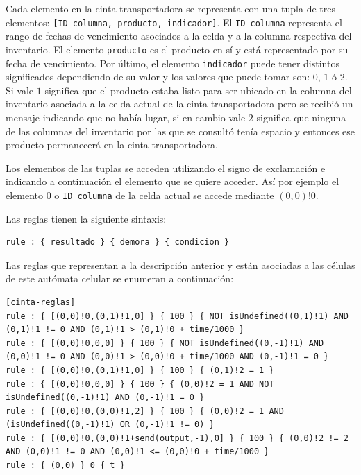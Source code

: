 \documentclass[10pt]{article}
\begin{document}
Cada elemento en la cinta transportadora se representa con una tupla de tres elementos: \texttt{[ID columna, producto, indicador]}. El \texttt{ID columna} representa el rango de fechas de vencimiento asociados a la celda y a la columna respectiva del inventario. El elemento \texttt{producto} es el producto en sí y está representado por su fecha de vencimiento. Por último, el elemento \texttt{indicador} puede tener distintos significados dependiendo de su valor y los valores que puede tomar son: $0$, $1$ ó $2$. Si vale $1$ significa que el producto estaba listo para ser ubicado en la columna del inventario asociada a la celda actual de la cinta transportadora pero se recibió un mensaje indicando que no había lugar, si en cambio vale $2$ significa que ninguna de las columnas del inventario por las que se consultó tenía espacio y entonces ese producto permanecerá en la cinta transportadora.

Los elementos de las tuplas se acceden utilizando el signo de exclamación e indicando a continuación el elemento que se quiere acceder. Así por ejemplo el elemento $0$ o \texttt{ID columna} de la celda actual se accede mediante $(0,0)!0$.

Las reglas tienen la siguiente sintaxis: 
\begin{lstlisting}
rule : { resultado } { demora } { condicion }
\end{lstlisting}

Las reglas que representan a la descripción anterior y están asociadas a las células de este autómata celular se enumeran a continuación:

\begin{minipage}{1\textwidth}
	\centering
	\begin{lstlisting}
[cinta-reglas]
rule : { [(0,0)!0,(0,1)!1,0] } { 100 } { NOT isUndefined((0,1)!1) AND (0,1)!1 != 0 AND (0,1)!1 > (0,1)!0 + time/1000 }
rule : { [(0,0)!0,0,0] } { 100 } { NOT isUndefined((0,-1)!1) AND (0,0)!1 != 0 AND (0,0)!1 > (0,0)!0 + time/1000 AND (0,-1)!1 = 0 } 
rule : { [(0,0)!0,(0,1)!1,0] } { 100 } { (0,1)!2 = 1 }
rule : { [(0,0)!0,0,0] } { 100 } { (0,0)!2 = 1 AND NOT isUndefined((0,-1)!1) AND (0,-1)!1 = 0 }
rule : { [(0,0)!0,(0,0)!1,2] } { 100 } { (0,0)!2 = 1 AND (isUndefined((0,-1)!1) OR (0,-1)!1 != 0) }
rule : { [(0,0)!0,(0,0)!1+send(output,-1),0] } { 100 } { (0,0)!2 != 2 AND (0,0)!1 != 0 AND (0,0)!1 <= (0,0)!0 + time/1000 }
rule : { (0,0) } 0 { t }
	\end{lstlisting}
\end{minipage}
\end{document}

